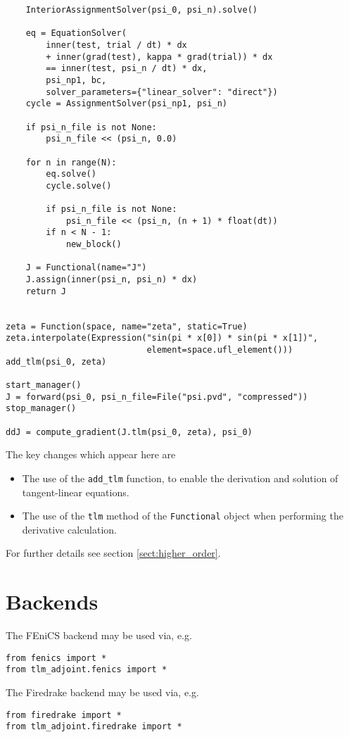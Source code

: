 \documentclass[11pt]{article}
\begin{document}
\begin{lstlisting}
    InteriorAssignmentSolver(psi_0, psi_n).solve()

    eq = EquationSolver(
        inner(test, trial / dt) * dx
        + inner(grad(test), kappa * grad(trial)) * dx
        == inner(test, psi_n / dt) * dx,
        psi_np1, bc,
        solver_parameters={"linear_solver": "direct"})
    cycle = AssignmentSolver(psi_np1, psi_n)

    if psi_n_file is not None:
        psi_n_file << (psi_n, 0.0)

    for n in range(N):
        eq.solve()
        cycle.solve()

        if psi_n_file is not None:
            psi_n_file << (psi_n, (n + 1) * float(dt))
        if n < N - 1:
            new_block()

    J = Functional(name="J")
    J.assign(inner(psi_n, psi_n) * dx)
    return J


zeta = Function(space, name="zeta", static=True)
zeta.interpolate(Expression("sin(pi * x[0]) * sin(pi * x[1])",
                            element=space.ufl_element()))
add_tlm(psi_0, zeta)

start_manager()
J = forward(psi_0, psi_n_file=File("psi.pvd", "compressed"))
stop_manager()

ddJ = compute_gradient(J.tlm(psi_0, zeta), psi_0)
\end{lstlisting}

The key changes which appear here are
\begin{itemize}
  \item The use of the \texttt{add\_tlm} function, to enable the derivation and
    solution of tangent-linear equations. 
  \item The use of the \texttt{tlm} method of the \texttt{Functional} object
    when performing the derivative calculation.
\end{itemize}
For further details see section \ref{sect:higher_order}.

\section{Backends}\label{sect:backends}

The FEniCS backend may be used via, e.g.
\begin{lstlisting}
from fenics import *
from tlm_adjoint.fenics import *
\end{lstlisting}

The Firedrake backend may be used via, e.g.
\begin{lstlisting}
from firedrake import *
from tlm_adjoint.firedrake import *
\end{lstlisting}
\end{document}
